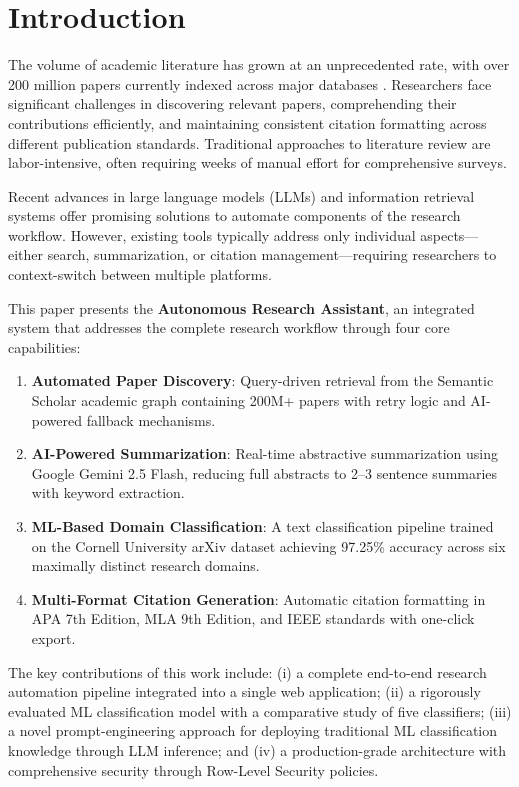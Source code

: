 \documentclass[conference]{IEEEtran}
\begin{document}
\section{Introduction}

The volume of academic literature has grown at an unprecedented rate, with over 200 million papers currently indexed across major databases \cite{semantic_scholar}. Researchers face significant challenges in discovering relevant papers, comprehending their contributions efficiently, and maintaining consistent citation formatting across different publication standards. Traditional approaches to literature review are labor-intensive, often requiring weeks of manual effort for comprehensive surveys.

Recent advances in large language models (LLMs) and information retrieval systems offer promising solutions to automate components of the research workflow. However, existing tools typically address only individual aspects---either search, summarization, or citation management---requiring researchers to context-switch between multiple platforms.

This paper presents the \textbf{Autonomous Research Assistant}, an integrated system that addresses the complete research workflow through four core capabilities:

\begin{enumerate}
    \item \textbf{Automated Paper Discovery}: Query-driven retrieval from the Semantic Scholar academic graph containing 200M+ papers with retry logic and AI-powered fallback mechanisms.
    \item \textbf{AI-Powered Summarization}: Real-time abstractive summarization using Google Gemini 2.5 Flash, reducing full abstracts to 2--3 sentence summaries with keyword extraction.
    \item \textbf{ML-Based Domain Classification}: A text classification pipeline trained on the Cornell University arXiv dataset \cite{arxiv_dataset} achieving 97.25\% accuracy across six maximally distinct research domains.
    \item \textbf{Multi-Format Citation Generation}: Automatic citation formatting in APA 7th Edition, MLA 9th Edition, and IEEE standards with one-click export.
\end{enumerate}

The key contributions of this work include: (i) a complete end-to-end research automation pipeline integrated into a single web application; (ii) a rigorously evaluated ML classification model with a comparative study of five classifiers; (iii) a novel prompt-engineering approach for deploying traditional ML classification knowledge through LLM inference; and (iv) a production-grade architecture with comprehensive security through Row-Level Security policies.
\end{document}
